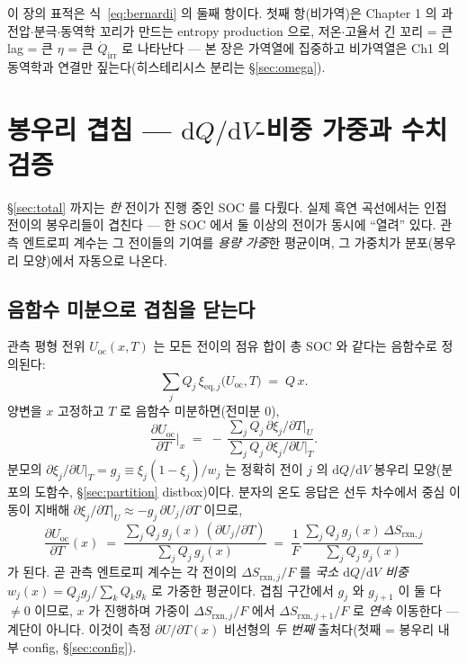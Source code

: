 \documentclass[11pt,a4paper]{article}
\newcommand{\dd}{\mathrm{d}}
\newcommand{\rxn}{\mathrm{rxn}}
\newcommand{\eq}{\mathrm{eq}}
\newcommand{\irr}{\mathrm{irr}}
\newcommand{\oc}{\mathrm{oc}}
\begin{document}
이 장의 표적은 식~\eqref{eq:bernardi} 의 둘째 항이다. 첫째 항(비가역)은 Chapter 1 의
과전압$\cdot$분극$\cdot$동역학 꼬리가 만드는 entropy production 으로, 저온$\cdot$고율서 긴 꼬리 = 큰
lag = 큰 $\eta$ = 큰 $\dot Q_\irr$ 로 나타난다 — 본 장은 가역열에 집중하고 비가역열은 Ch1 의 동역학과
연결만 짚는다(히스테리시스 분리는 \S\ref{sec:omega}).

\section{봉우리 겹침 — $\dd Q/\dd V$-비중 가중과 수치검증}\label{sec:overlap}
\S\ref{sec:total} 까지는 \emph{한} 전이가 진행 중인 SOC 를 다뤘다. 실제 흑연 곡선에서는 인접 전이의
봉우리들이 겹친다 — 한 SOC 에서 둘 이상의 전이가 동시에 ``열려'' 있다. 관측 엔트로피 계수는 그
전이들의 기여를 \emph{용량 가중}한 평균이며, 그 가중치가 분포(봉우리 모양)에서 자동으로 나온다.

\subsection{음함수 미분으로 겹침을 닫는다}
관측 평형 전위 $U_\oc(x,T)$ 는 모든 전이의 점유 합이 총 SOC 와 같다는 음함수로 정의된다:
\begin{equation}
\sum_j Q_j\,\xi_{\eq,j}\big(U_\oc,T\big)\;=\;Q\,x.
\label{eq:implicit}
\end{equation}
양변을 $x$ 고정하고 $T$ 로 음함수 미분하면(전미분 $0$),
\begin{equation}
\frac{\partial U_\oc}{\partial T}\Big|_x
   \;=\;-\,\frac{\sum_j Q_j\,\partial\xi_j/\partial T|_U}{\sum_j Q_j\,\partial\xi_j/\partial U|_T}.
\label{eq:implicit_diff}
\end{equation}
분모의 $\partial\xi_j/\partial U|_T = g_j \equiv \xi_j(1-\xi_j)/w_j$ 는 정확히 전이 $j$ 의
$\dd Q/\dd V$ 봉우리 모양(분포의 도함수, \S\ref{sec:partition} distbox)이다. 분자의 온도 응답은 선두
차수에서 중심 이동이 지배해 $\partial\xi_j/\partial T|_U \approx -g_j\,\partial U_j/\partial T$ 이므로,
\begin{equation}
\boxed{\;
\frac{\partial U_\oc}{\partial T}(x)
   \;=\;\frac{\sum_j Q_j\,g_j(x)\,(\partial U_j/\partial T)}{\sum_j Q_j\,g_j(x)}
   \;=\;\frac{1}{F}\,\frac{\sum_j Q_j\,g_j(x)\,\Delta S_{\rxn,j}}{\sum_j Q_j\,g_j(x)}\;}
\label{eq:qrev_sum}
\end{equation}
가 된다. 곧 관측 엔트로피 계수는 각 전이의 $\Delta S_{\rxn,j}/F$ 를 \emph{국소 $\dd Q/\dd V$ 비중}
$w_j(x)=Q_jg_j/\sum_k Q_kg_k$ 로 가중한 평균이다. 겹침 구간에서 $g_j$ 와 $g_{j+1}$ 이 둘 다 $\neq0$
이므로, $x$ 가 진행하며 가중이 $\Delta S_{\rxn,j}/F$ 에서 $\Delta S_{\rxn,j+1}/F$ 로 \emph{연속} 이동한다 —
계단이 아니다. 이것이 측정 $\partial U/\partial T(x)$ 비선형의 \emph{두 번째} 출처다(첫째 = 봉우리 내부
config, \S\ref{sec:config}).
\end{document}
